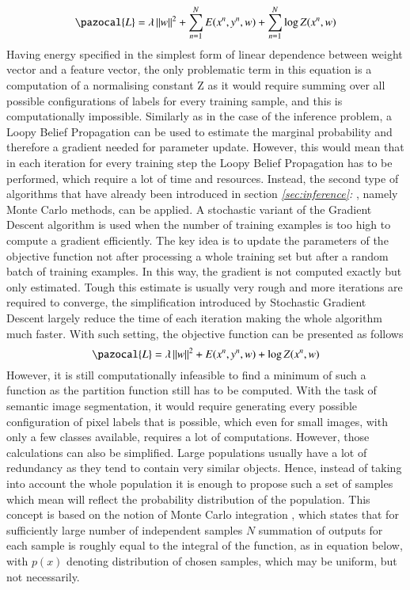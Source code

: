 \begin{equation}
    \label{eq:regularisation_prob}
    \pazocal{L} = \lambda \left \| w \right \|^2 + \sum_{n=1}^{N}{E(x^n,y^n,w)} + \sum_{n=1}^{N}{\log{Z}(x^n,w)}
\end{equation}
Having energy specified in the simplest form of linear dependence between weight vector and a feature vector, the only problematic term in this equation is a computation of a normalising constant Z as it would require summing over all possible configurations of labels for every training sample, and this is computationally impossible. Similarly as in the case of the inference problem, a Loopy Belief Propagation can be used to estimate the marginal probability and therefore a gradient needed for parameter update. However, this would mean that in each iteration for every training step the Loopy Belief Propagation has to be performed, which require a lot of time and resources. Instead, the second type of algorithms that have already been introduced in section \textit{\ref{sec:inference}: }, namely Monte Carlo methods, can be applied. A stochastic variant of the Gradient Descent algorithm is used when the number of training examples is too high to compute a gradient efficiently. The key idea is to update the parameters of the objective function not after processing a whole training set but after a random batch of training examples. In this way, the gradient is not computed exactly but only estimated. Tough this estimate is usually very rough and more iterations are required to converge, the simplification introduced by Stochastic Gradient Descent largely reduce the time of each iteration making the whole algorithm much faster. With such setting, the objective function can be presented as follows
\begin{equation}
    \label{eq:regularisation_prob}
    \pazocal{L} = \lambda \left \| w \right \|^2 + E(x^n,y^n,w) + \log{Z}(x^n,w)
\end{equation}
However, it is still computationally infeasible to find a minimum of such a function as the partition function still has to be computed. With the task of semantic image segmentation, it would require generating every possible configuration of pixel labels that is possible, which even for small images, with only a few classes available, requires a lot of computations. However, those calculations can also be simplified. Large populations usually have a lot of redundancy as they tend to contain very similar objects. Hence, instead of taking into account the whole population it is enough to propose such a set of samples which mean will reflect the probability distribution of the population. This concept is based on the notion of Monte Carlo integration , which states that for sufficiently large number of independent samples $N$ summation of outputs for each sample is roughly equal to the integral of the function, as in equation below, with $p(x)$ denoting distribution of chosen samples, which may be uniform, but not necessarily.
